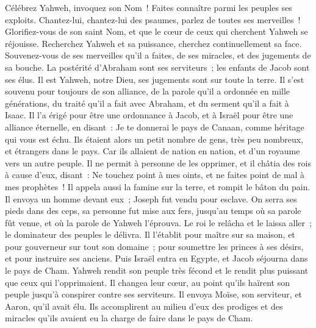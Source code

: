 \begin{multicols}{2}
\VerseOne{}Célébrez Yahweh, invoquez son Nom~! Faites connaître parmi les peuples ses exploits.
Chantez-lui, chantez-lui des psaumes, parlez de toutes ses merveilles~!
Glorifiez-vous de son saint Nom, et que le cœur de ceux qui cherchent Yahweh se réjouisse.
Recherchez Yahweh et sa puissance, cherchez continuellement sa face.
Souvenez-vous de ses merveilles qu'il a faites, de ses miracles, et des jugements de sa bouche.
La postérité d'Abraham sont ses serviteurs~; les enfants de Jacob sont ses élus.
Il est Yahweh, notre Dieu, ses jugements sont sur toute la terre.
Il s'est souvenu pour toujours de son alliance, de la parole qu'il a ordonnée en mille générations,
du traité qu'il a fait avec Abraham, et du serment qu'il a fait à Isaac.
Il l'a érigé pour être une ordonnance à Jacob, et à Israël pour être une alliance éternelle,
en disant~: Je te donnerai le pays de Canaan, comme héritage qui vous est échu.
Ils étaient alors un petit nombre de gens, très peu nombreux, et étrangers dans le pays.
Car ils allaient de nation en nation, et d'un royaume vers un autre peuple.
Il ne permit à personne de les opprimer, et il châtia des rois à cause d'eux,
disant~: Ne touchez point à mes oints, et ne faites point de mal à mes prophètes~!
Il appela aussi la famine sur la terre, et rompit le bâton du pain.
Il envoya un homme devant eux~; Joseph fut vendu pour esclave.
On serra ses pieds dans des ceps, sa personne fut mise aux fers,
jusqu'au temps où sa parole fût venue, et où la parole de Yahweh l'éprouva.
Le roi le relâcha et le laissa aller~; le dominateur des peuples le délivra.
Il l'établit pour maître sur sa maison, et pour gouverneur sur tout son domaine~;
pour soumettre les princes à ses désirs, et pour instruire ses anciens.
Puis Israël entra en Egypte, et Jacob séjourna dans le pays de Cham.
Yahweh rendit son peuple très fécond et le rendit plus puissant que ceux qui l'opprimaient.
Il changea leur cœur, au point qu'ils haïrent son peuple jusqu'à conspirer contre ses serviteurs.
Il envoya Moïse, son serviteur, et Aaron, qu'il avait élu.
Ils accomplirent au milieu d'eux des prodiges et des miracles qu'ils avaient eu la charge de faire dans le pays de Cham.

\end{multicols}
